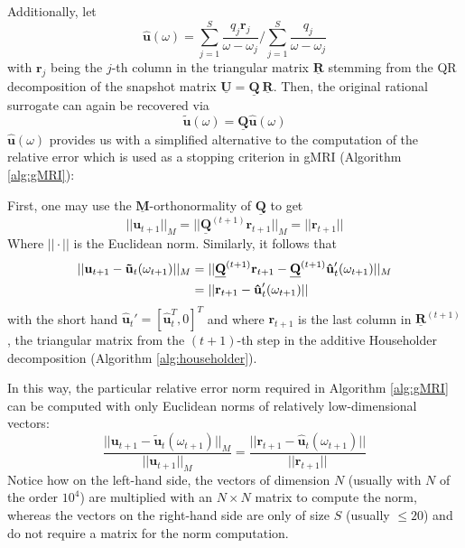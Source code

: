 \documentclass[11pt, a4paper]{article}
\begin{document}
Additionally, let
\begin{equation}
    \mathbf{\hat{u}}(\omega) = \sum_{j=1}^S \frac{q_j \mathbf{r}_j}{\omega - \omega_j}
    / \sum_{j=1}^S \frac{q_j}{\omega - \omega_j} \label{equ:u-ring}
\end{equation}
with $\mathbf{r}_j$ being the $j$-th column in the triangular matrix
$\mathbf{\underline{R}}$ stemming from the QR decomposition of the snapshot
matrix $\mathbf{\underline{U}} = \mathbf{\underline{Q}} ~ \mathbf{\underline{R}}$.
Then, the original rational surrogate can again be recovered via
\begin{equation}
    \mathbf{\tilde{u}}(\omega) = \mathbf{\underline{Q}} \mathbf{\hat{u}}(\omega)
\end{equation}
$\mathbf{\hat{u}}(\omega)$ provides us with a simplified alternative to the
computation of the relative error which is used as a stopping criterion in
\acrshort{gMRI} (Algorithm \ref{alg:gMRI}):

First, one may use the $\mathbf{\underline{M}}$-orthonormality of $\mathbf{\underline{Q}}$
to get
\begin{equation}
    ||\mathbf{u}_{t+1}||_M = ||\mathbf{\underline{Q}}^{(t+1)} \mathbf{r}_{t+1}||_M
                = ||\mathbf{r}_{t+1}|| 
\end{equation}
Where $||\cdot||$ is the Euclidean norm. Similarly, it follows that
\begin{align}
    ||\mathbf{u}_{t+1} - \mathbf{\tilde{u}}_{t}(\omega_{t+1})||_M
    &= ||\mathbf{\underline{Q}}^{(t+1)} \mathbf{r}_{t+1} - \mathbf{\underline{Q}}^{(t+1)}\mathbf{\hat{u}}_{t}'(\omega_{t+1})||_M \notag \\
    &= ||\mathbf{r}_{t+1} - \mathbf{\hat{u}}_{t}'(\omega_{t+1})||
\end{align}
with the short hand $\mathbf{\hat{u}}_{t}' = [\mathbf{\hat{u}}_{t}^T, 0]^T$
and where $\mathbf{r}_{t+1}$ is the last column in $\mathbf{\underline{R}}^{(t+1)}$,
the triangular matrix from the $(t+1)$-th step in the additive Householder decomposition
(Algorithm \ref{alg:householder}). 

In this way, the particular relative error norm required in
Algorithm \ref{alg:gMRI} can be computed with only Euclidean norms of relatively
low-dimensional vectors:
\begin{equation}
    \frac{||\mathbf{u}_{t+1} - \mathbf{\tilde{u}}_t(\omega_{t+1})||_M}{||\mathbf{u}_{t+1}||_M}
    = \frac{||\mathbf{r}_{t+1} - \mathbf{\hat{u}}_t(\omega_{t+1})||}{||\mathbf{r}_{t+1}||}
\end{equation}
Notice how on the left-hand side, the vectors of dimension $N$ (usually with $N$ of the order $10^4$)
are multiplied with an $N \times N$ matrix to compute the norm, whereas
the vectors on the right-hand side are only of size $S$ (usually $\leq 20$)
and do not require a matrix for the norm computation.
\end{document}
